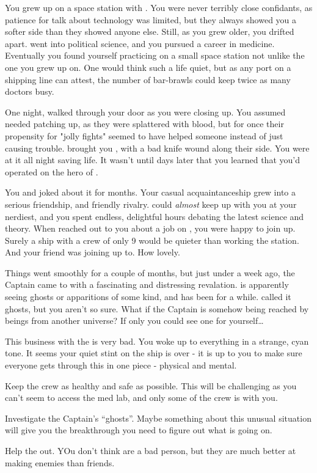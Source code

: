 \documentclass[char]{TMFHope}
\begin{document}
\name{\cMed{}}

You grew up on a space station with \cDip{}. You were never terribly close confidants, as \cDip{\their} patience for talk about technology was limited, but they always showed you a softer side than they showed anyone else. Still, as you grew older, you drifted apart. \cDip{} went into political science, and you pursued a career in medicine. Eventually you found yourself practicing on a small space station not unlike the one you grew up on. One would think such a life quiet, but as any port on a shipping line can attest, the number of bar-brawls could keep twice as many doctors busy.

One night, \cSci{} walked through your door as you were closing up. You assumed \cSci{\they} needed patching up, as they were splattered with blood, but for once their propensity for "jolly fights" seemed to have helped someone instead of just causing trouble. \cSci{\They} brought you \cCap{}, with a bad knife wound along their side. You were at it all night saving \cCap{\their} life. It wasn't until days later that you learned that you'd operated on the hero of \pBattle{}.

You and \cSci{} joked about it for months. Your casual acquaintanceship grew into a serious friendship, and friendly rivalry. \cSci{} could \emph{almost} keep up with you at your nerdiest, and you spent endless, delightful hours debating the latest science and theory. When \cCap{} reached out to you about a job on \pNew{}, you were happy to join up. Surely a ship with a crew of only 9 would be quieter than working the station. And your friend \cSci{} was joining up to. How lovely.

Things went smoothly for a couple of months, but just under a week ago, the Captain came to with a fascinating and distressing revalation. \cCap{} is apparently seeing ghosts or apparitions of some kind, and has been for a while. \cCap{\They} called it ghosts, but you aren't so sure. What if the Captain is somehow being reached by beings from another universe? If only you could see one for yourself\ldots

This business with the \pNew{} is very bad. You woke up to everything in a strange, cyan tone. It seems your quiet stint on the ship is over - it is up to you to make sure everyone gets through this in one piece - physical and mental.

\begin{itemz}[Goals]
	\item Keep the crew as healthy and safe as possible. This will be challenging as you can't seem to access the med lab, and only some of the crew is with you.
	\item Investigate the Captain's ``ghosts''. Maybe something about this unusual situation will give you the breakthrough you need to figure out what is going on.
	\item Help the \cDip{} out. YOu don't think \cDip{\they} are a bad person, but they are much better at making enemies than friends.
\end{itemz}
\end{document}
